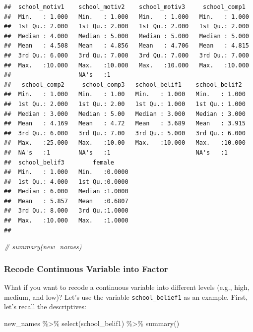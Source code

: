 \documentclass[
]{article}
\newenvironment{Shaded}{\begin{snugshade}}{\end{snugshade}}
\newcommand{\CommentTok}[1]{\textcolor[rgb]{0.56,0.35,0.01}{\textit{#1}}}
\newcommand{\FunctionTok}[1]{\textcolor[rgb]{0.00,0.00,0.00}{#1}}
\newcommand{\NormalTok}[1]{#1}
\newcommand{\SpecialCharTok}[1]{\textcolor[rgb]{0.00,0.00,0.00}{#1}}
\begin{document}
\begin{verbatim}
##  school_motiv1    school_motiv2    school_motiv3     school_comp1   
##  Min.   : 1.000   Min.   : 1.000   Min.   : 1.000   Min.   : 1.000  
##  1st Qu.: 2.000   1st Qu.: 2.000   1st Qu.: 2.000   1st Qu.: 2.000  
##  Median : 4.000   Median : 5.000   Median : 5.000   Median : 5.000  
##  Mean   : 4.508   Mean   : 4.856   Mean   : 4.706   Mean   : 4.815  
##  3rd Qu.: 6.000   3rd Qu.: 7.000   3rd Qu.: 7.000   3rd Qu.: 7.000  
##  Max.   :10.000   Max.   :10.000   Max.   :10.000   Max.   :10.000  
##                   NA's   :1                                         
##   school_comp2     school_comp3   school_belif1    school_belif2   
##  Min.   : 1.000   Min.   : 1.00   Min.   : 1.000   Min.   : 1.000  
##  1st Qu.: 2.000   1st Qu.: 2.00   1st Qu.: 1.000   1st Qu.: 1.000  
##  Median : 3.000   Median : 5.00   Median : 3.000   Median : 3.000  
##  Mean   : 4.169   Mean   : 4.72   Mean   : 3.689   Mean   : 3.915  
##  3rd Qu.: 6.000   3rd Qu.: 7.00   3rd Qu.: 5.000   3rd Qu.: 6.000  
##  Max.   :25.000   Max.   :10.00   Max.   :10.000   Max.   :10.000  
##  NA's   :1        NA's   :1                        NA's   :1       
##  school_belif3        female      
##  Min.   : 1.000   Min.   :0.0000  
##  1st Qu.: 4.000   1st Qu.:0.0000  
##  Median : 6.000   Median :1.0000  
##  Mean   : 5.857   Mean   :0.6807  
##  3rd Qu.: 8.000   3rd Qu.:1.0000  
##  Max.   :10.000   Max.   :1.0000  
## 
\end{verbatim}

\begin{Shaded}
\begin{Highlighting}[]
\CommentTok{\# summary(new\_names)}
\end{Highlighting}
\end{Shaded}

\hypertarget{recode-continuous-variable-into-factor}{%
\subsubsection{Recode Continuous Variable into
Factor}\label{recode-continuous-variable-into-factor}}

What if you want to recode a continuous variable into different levels
(e.g., high, medium, and low)? Let's use the variable
\texttt{school\_belief1} as an example. First, let's recall the
descriptives:

\begin{Shaded}
\begin{Highlighting}[]
\NormalTok{new\_names }\SpecialCharTok{\%\textgreater{}\%} 
  \FunctionTok{select}\NormalTok{(school\_belif1) }\SpecialCharTok{\%\textgreater{}\%} 
  \FunctionTok{summary}\NormalTok{() }
\end{Highlighting}
\end{Shaded}
\end{document}
